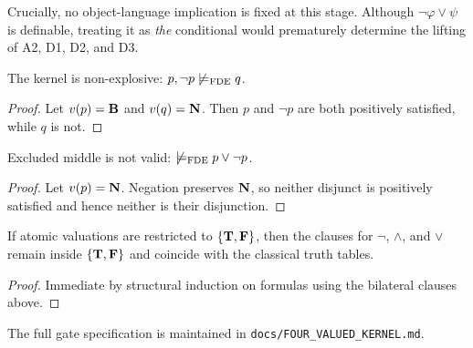Crucially, no object-language implication is fixed at this stage. Although \(\neg\varphi\lor\psi\) is definable, treating it as \emph{the} conditional would prematurely determine the lifting of A2, D1, D2, and D3.

\begin{proposition}[Paraconsistency]
The kernel is non-explosive: \(p,\neg p\not\models_{\mathrm{FDE}}q\).
\end{proposition}
\begin{proof}
Let \(v(p)=\mathbf{B}\) and \(v(q)=\mathbf{N}\). Then \(p\) and \(\neg p\) are both positively satisfied, while \(q\) is not.
\end{proof}

\begin{proposition}[Paracompleteness]
Excluded middle is not valid: \(\not\models_{\mathrm{FDE}}p\lor\neg p\).
\end{proposition}
\begin{proof}
Let \(v(p)=\mathbf{N}\). Negation preserves \(\mathbf{N}\), so neither disjunct is positively satisfied and hence neither is their disjunction.
\end{proof}

\begin{proposition}
If atomic valuations are restricted to \(\{\mathbf{T},\mathbf{F}\}\), then the clauses for \(\neg\), \(\land\), and \(\lor\) remain inside \(\{\mathbf{T},\mathbf{F}\}\) and coincide with the classical truth tables.
\end{proposition}
\begin{proof}
Immediate by structural induction on formulas using the bilateral clauses above.
\end{proof}

The full gate specification is maintained in \texttt{docs/FOUR\_VALUED\_KERNEL.md}.
